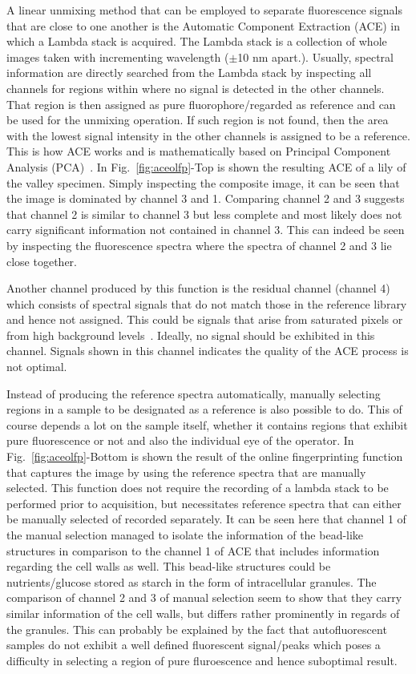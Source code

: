 A linear unmixing method that can be employed to separate fluorescence signals that are close to one another is the Automatic Component Extraction (ACE) in which a Lambda stack is acquired. 
The Lambda stack is a collection of whole images taken with incrementing wavelength ($\pm$10 nm apart.). 
Usually, spectral information are directly searched from the Lambda stack by inspecting all channels for regions within where no signal is detected in the other channels. 
That region is then assigned as pure fluorophore/regarded as reference and can be used for the unmixing operation. 
If such region is not found, then the area with the lowest signal intensity in the other channels is assigned to be a reference.
This is how ACE works and is mathematically based on Principal Component Analysis (PCA)~\cite{ZeissCamp2}.
In Fig.~\ref{fig:aceolfp}-Top is shown the resulting ACE of a lily of the valley specimen.
Simply inspecting the composite image, it can be seen that the image is dominated by channel 3 and 1. 
Comparing channel 2 and 3 suggests that channel 2 is similar to channel 3 but less complete and most likely does not carry significant information not contained in channel 3. 
This can indeed be seen by inspecting the fluorescence spectra where the spectra of channel 2 and 3 lie close together.

Another channel produced by this function is the residual channel (channel 4) which consists of spectral signals that do not match those in the reference library and hence not assigned. 
This could be signals that arise from saturated pixels or from high background levels~\cite{ZeissCamp2}. 
Ideally, no signal should be exhibited in this channel. Signals shown in this channel indicates the quality of the ACE process is not optimal.

Instead of producing the reference spectra automatically, manually selecting regions in a sample to be designated as a reference is also possible to do. 
This of course depends a lot on the sample itself, whether it contains regions that exhibit pure fluorescence or not and also the individual eye of the operator. 
In Fig.~\ref{fig:aceolfp}-Bottom is shown the result of the online fingerprinting function that captures the image by using the reference spectra that are manually selected. 
This function does not require the recording of a lambda stack to be performed prior to acquisition, but necessitates reference spectra that can either be manually selected of recorded separately.
It can be seen here that channel 1 of the manual selection managed to isolate the information of the bead-like structures in comparison to the channel 1 of ACE that includes information regarding the cell walls as well. 
This bead-like structures could be nutrients/glucose stored as starch in the form of intracellular granules. 
The comparison of channel 2 and 3 of manual selection seem to show that they carry similar information of the cell walls, but differs rather prominently in regards of the granules. 
This can probably be explained by the fact that autofluorescent samples do not exhibit a well defined fluorescent signal/peaks which poses a difficulty in selecting a region of pure fluroescence and hence suboptimal result. 

